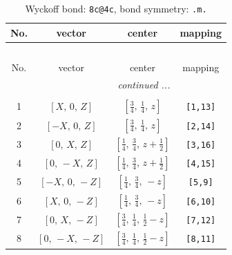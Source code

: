 \documentclass[fleqn,8pt]{jsarticle}
\begin{document}
\begin{longtable}{cccc}
\caption{Wyckoff bond: {\tt 8c@4c}, bond symmetry: {\tt .m.}}
 \\
 \hline \hline
No. & vector & center & mapping \\ \hline \endfirsthead

\multicolumn{3}{l}{\tablename\ \thetable{}} \\
 \hline \hline
No. & vector & center & mapping \\ \hline \endhead

 \hline \hline
\multicolumn{3}{r}{\footnotesize\it continued ...} \\ \endfoot

 \hline \hline
\multicolumn{3}{r}{} \\ \endlastfoot

1 & $\left[ X,\, 0,\, Z \right]$ & $\left[ \frac{3}{4},\, \frac{1}{4},\, z \right]$ & {\tt [1,13]} \\ \hline
2 & $\left[ - X,\, 0,\, Z \right]$ & $\left[ \frac{3}{4},\, \frac{1}{4},\, z \right]$ & {\tt [2,14]} \\ \hline
3 & $\left[ 0,\, X,\, Z \right]$ & $\left[ \frac{1}{4},\, \frac{3}{4},\, z + \frac{1}{2} \right]$ & {\tt [3,16]} \\ \hline
4 & $\left[ 0,\, - X,\, Z \right]$ & $\left[ \frac{1}{4},\, \frac{3}{4},\, z + \frac{1}{2} \right]$ & {\tt [4,15]} \\ \hline
5 & $\left[ - X,\, 0,\, - Z \right]$ & $\left[ \frac{1}{4},\, \frac{3}{4},\, - z \right]$ & {\tt [5,9]} \\ \hline
6 & $\left[ X,\, 0,\, - Z \right]$ & $\left[ \frac{1}{4},\, \frac{3}{4},\, - z \right]$ & {\tt [6,10]} \\ \hline
7 & $\left[ 0,\, X,\, - Z \right]$ & $\left[ \frac{3}{4},\, \frac{1}{4},\, \frac{1}{2} - z \right]$ & {\tt [7,12]} \\ \hline
8 & $\left[ 0,\, - X,\, - Z \right]$ & $\left[ \frac{3}{4},\, \frac{1}{4},\, \frac{1}{2} - z \right]$ & {\tt [8,11]} \\
\end{longtable}
\renewcommand{\arraystretch}{1.2}
\end{document}

